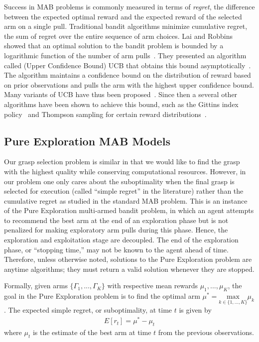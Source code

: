 \documentclass[journal,transmag]{IEEEtran}%
\begin{document}
Success in MAB problems is commonly measured in terms of {\it regret}, the difference between the expected optimal reward and the expected reward of the selected arm on a single pull.
Traditional bandit algorithms minimize cumulative regret, the sum of regret over the entire sequence of arm choices.
Lai and Robbins showed that an optimal solution to the bandit problem is bounded by a logarithmic function of the number of arm pulls~\cite{lai1985asymptotically}.
They presented an algorithm called (Upper Confidence Bound) UCB that obtains this bound asymptotically~\cite{lai1985asymptotically}.
The algorithm maintains a confidence bound on the distribution of reward based on prior observations and pulls the arm with the highest upper confidence bound.
Many variants of UCB have thus been proposed~\cite{}. 
Since then a several other algorithms have been shown to achieve this bound, such as the Gittins index policy~\cite{} and Thompson sampling for certain reward distributions~\cite{}.

\subsection{Pure Exploration MAB Models}
Our grasp selection problem is similar in that we would like to find the grasp with the highest quality while conserving computational resources.
However, in our problem one only cares about the suboptimality when the final grasp is selected for execution (called ``simple regret'' in the literature) rather than the cumulative regret as studied in the standard MAB problem.
This is an instance of the Pure Exploration multi-armed bandit problem\cite{bubeck2009pure}, in which an agent attempts to recommend the best arm at the end of an exploration phase but is not penalized for making exploratory arm pulls during this phase.
Hence, the exploration and exploitation stage are decoupled. 
The end of the exploration phase, or ``stopping time,'' may not be known to the agent ahead of time.
Therefore, unless otherwise noted, solutions to the Pure Exploration problem are anytime algorithms; they must return a valid solution whenever they are stopped.

Formally, given arms $\lbrace \Gamma_1, ..., \Gamma_K \rbrace$ with respective mean rewards $\mu_1, ..., \mu_K$, the goal in the Pure Exploration problem is to find the optimal arm $\mu^* = \underset{k\in\lbrace 1, ..., K \rbrace}{\mbox{max}} \mu_k$.
The expected simple regret, or suboptimality, at time $t$ is given by
\begin{align}\label{eq:simple_regret}
E[r_t] = \mu^* - \mu_t
\end{align}
\noindent where $\mu_t$ is the estimate of the best arm at time $t$ from the previous observations.
\end{document}
